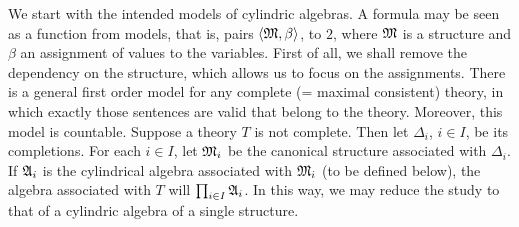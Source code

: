 We start with the intended models of cylindric algebras. A formula
may be seen as a function from models, that is, pairs $\langle \mathfrak{M},
\beta\rangle$, to $2$, where $\mathfrak{M}$ is a structure and $\beta$ an
assignment of values to the variables.  First of all, we shall
remove the dependency on the structure, which allows us to focus
on the assignments. There is a general first order model for any
complete (= maximal consistent) theory, in which exactly those
sentences are valid that belong to the theory. Moreover, this model
is countable. Suppose a theory $T$ is not complete. Then let $\Delta_i$, 
$i \in I$, be its completions. For each $i \in I$, let $\mathfrak{M}_i$ be the 
canonical structure associated with $\Delta_i$. If $\mathfrak{A}_i$ is the
cylindrical algebra associated with $\mathfrak{M}_i$ (to be defined below),
the algebra associated with $T$ will $\prod_{i \in I} \mathfrak{A}_i$. In this 
way, we may reduce the study to that of a cylindric algebra of a single 
structure.

